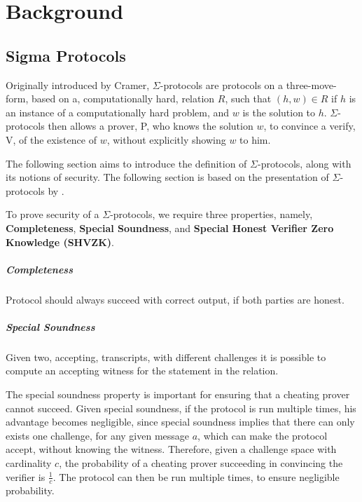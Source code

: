 \chapter{Background}
\label{ch:background}


\section{Sigma Protocols}
\label{sec:sigma_protocols}
Originally introduced by Cramer, $\Sigma$-protocols are protocols on a
three-move-form, based on a, computationally hard, relation $R$, such that $(h, w) \in R$
if $h$ is an instance of a computationally hard problem, and $w$ is
the solution to $h$. $\Sigma$-protocols then allows a prover, P, who knows the
solution $w$, to convince a verify, V, of the existence of $w$, without
explicitly showing $w$ to him.

The following section aims to introduce the definition of $\Sigma$-protocols,
along with its notions of security. The following section is based on the
presentation of $\Sigma$-protocols by \citet{on-sigma-protocols}.

To prove security of a $\Sigma$-protocols, we require three properties, namely,
\textbf{Completeness}, \textbf{Special Soundness}, and \textbf{Special Honest Verifier Zero Knowledge (SHVZK)}.

\paragraph{Completeness}
Protocol should always succeed with correct output, if both parties are honest.

\paragraph{Special Soundness}
Given two, accepting, transcripts, with different challenges it is possible to
compute an accepting witness for the statement in the relation.

The special soundness property is important for ensuring that a cheating prover
cannot succeed. Given special soundness, if the protocol is run multiple times,
his advantage becomes negligible, since special soundness implies that there can
only exists one challenge, for any given message $a$, which can make the
protocol accept, without knowing the witness. Therefore, given a challenge space
with cardinality $c$, the probability of a cheating prover succeeding in
convincing the verifier is $\frac{1}{c}$. The protocol can then be run multiple
times, to ensure negligible probability.

